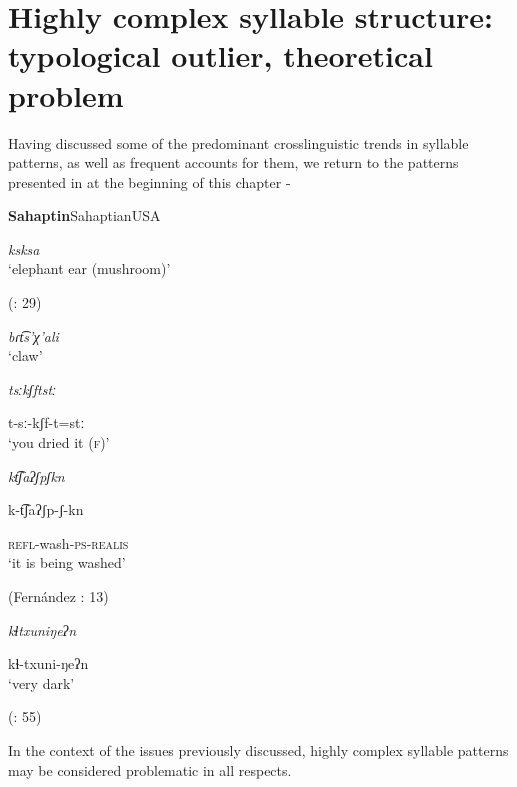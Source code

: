 \section{Highly complex syllable structure: typological outlier, theoretical problem}\label{sec:1.2}

  Having discussed some of the predominant crosslinguistic trends in syllable patterns, as well as frequent accounts for them, we return to the patterns presented in at the beginning of this chapter -

\ea\label{ex:1.8}
 \textbf{Sahaptin}{Sahaptian}{USA}

\textit{ksksa}\\
\glt ‘elephant ear (mushroom)’

(\citealt{HargusBeavert2006}: 29)
\z

\ea\label{ex:1.9}

\textit{bɾt͡s’χ’ali}\\
\glt ‘claw’
\citep[204]{Butskhrikidze2002}
\z

\ea\label{ex:1.10}

\textit{tsːkʃftstː}

t-sː-kʃf-t=stː\\
\glt ‘you dried it (\textsc{f})’
\citep[332]{Ridouane2008}
\z

\ea\label{ex:1.11}

\textit{kt͡ʃaʔʃpʃkn}

k-t͡ʃaʔʃp-ʃ-kn

\textsc{refl}-wash-\textsc{ps-realis}\\
\glt ‘it is being washed’

(Fernández \citealt{GarayHernández2006}: 13)
\z

\ea\label{ex:1.12}

\textit{kɬtxuniŋeʔn}

kɬ-txuni-ŋeʔn\\
\glt ‘very dark’

(\citealt{GeorgVolodin1999}: 55)
\z

In the context of the issues previously discussed, highly complex syllable patterns may be considered problematic in all respects.

